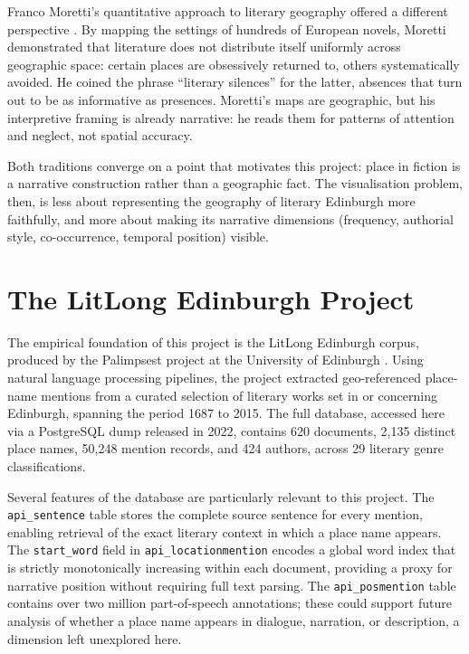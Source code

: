 \documentclass[logo,msc]{infthesis}
\begin{document}
Franco Moretti's quantitative approach to literary geography offered a different perspective \cite{moretti2005}. By mapping the settings of hundreds of European novels, Moretti demonstrated that literature does not distribute itself uniformly across geographic space: certain places are obsessively returned to, others systematically avoided. He coined the phrase ``literary silences'' for the latter, absences that turn out to be as informative as presences. Moretti's maps are geographic, but his interpretive framing is already narrative: he reads them for patterns of attention and neglect, not spatial accuracy.

Both traditions converge on a point that motivates this project: place in fiction is a narrative construction rather than a geographic fact. The visualisation problem, then, is less about representing the geography of literary Edinburgh more faithfully, and more about making its narrative dimensions (frequency, authorial style, co-occurrence, temporal position) visible.
 
\section{The LitLong Edinburgh Project}
 
The empirical foundation of this project is the LitLong Edinburgh corpus, produced by the Palimpsest project at the University of Edinburgh \cite{anderson2016}. Using natural language processing pipelines, the project extracted geo-referenced place-name mentions from a curated selection of literary works set in or concerning Edinburgh, spanning the period 1687 to 2015. The full database, accessed here via a PostgreSQL dump released in 2022, contains 620 documents, 2,135 distinct place names, 50,248 mention records, and 424 authors, across 29 literary genre classifications.
 
Several features of the database are particularly relevant to this project. The \texttt{api\_sentence} table stores the complete source sentence for every mention, enabling retrieval of the exact literary context in which a place name appears. The \texttt{start\_word} field in \texttt{api\_locationmention} encodes a global word index that is strictly monotonically increasing within each document, providing a proxy for narrative position without requiring full text parsing. The \texttt{api\_posmention} table contains over two million part-of-speech annotations; these could support future analysis of whether a place name appears in dialogue, narration, or description, a dimension left unexplored here.
 
\end{document}
